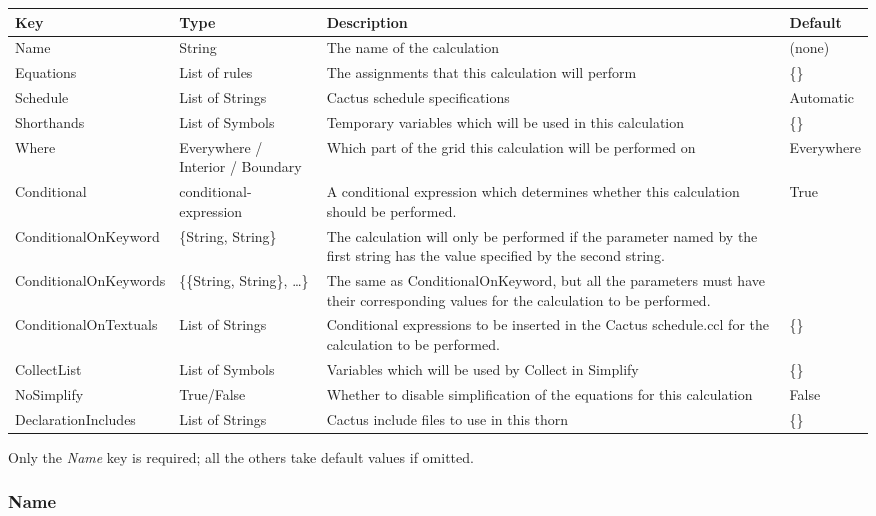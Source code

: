 \documentclass{report}
\newcommand{\tablewidth}{\textwidth}
\begin{document}
\begin{center}
\begin{tabularx}{\tablewidth}{|l|X|X|l|}
  \hline
  \bf Key & \bf Type & \bf Description & \bf Default\\
  \hline
  Name & String & The name of the calculation & (none) \\
  Equations & List of rules & The assignments that this calculation will perform & \{\} \\
  Schedule & List of Strings & Cactus schedule specifications & Automatic \\
  Shorthands & List of Symbols & Temporary variables which will be used in this calculation & \{\} \\
  Where &  Everywhere / Interior / Boundary & Which part of the grid this calculation will be performed on & Everywhere \\
  Conditional & conditional-expression &A conditional expression which determines whether this calculation should be performed. & True \\
  ConditionalOnKeyword & \{String, String\} &
    The calculation will only be performed if the parameter named by the first string has the value specified by the second string.   &  \\
  ConditionalOnKeywords & \{\{String, String\}, \ldots \} &
    The same as ConditionalOnKeyword, but all the parameters must have their corresponding values for the calculation to be performed.&  \\
  ConditionalOnTextuals & List of Strings & Conditional expressions to be inserted in the Cactus schedule.ccl for the calculation to be performed. & \{\} \\
  CollectList & List of Symbols & Variables which will be used by Collect in Simplify & \{\} \\
  NoSimplify & True/False & Whether to disable simplification of the equations for this calculation & False \\
  DeclarationIncludes & List of Strings & Cactus include files to use in this thorn & \{\} \\
  \hline
\end{tabularx}
\end{center}

Only the {\it Name} key is required; all the others take default
values if omitted.

\subsubsection{Name}
\end{document}
